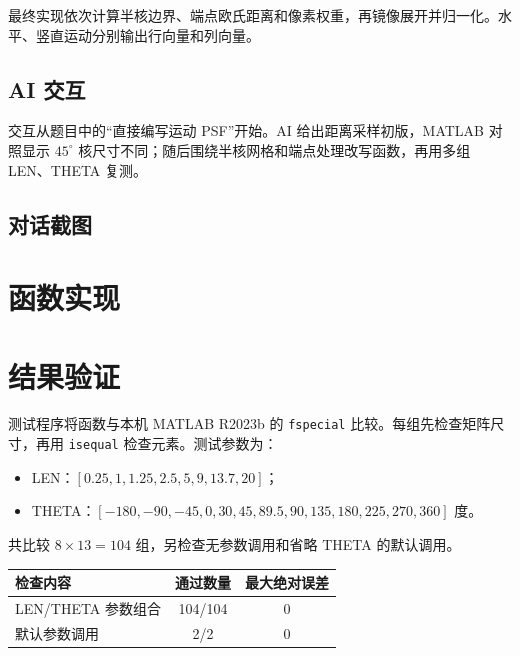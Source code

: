 \documentclass[UTF8,12pt,a4paper]{ctexart}
\begin{document}
最终实现依次计算半核边界、端点欧氏距离和像素权重，再镜像展开并归一化。水平、竖直运动分别输出行向量和列向量。

\subsection*{AI 交互}
交互从题目中的“直接编写运动 PSF”开始。AI 给出距离采样初版，MATLAB 对照显示 $45^\circ$ 核尺寸不同；随后围绕半核网格和端点处理改写函数，再用多组 LEN、THETA 复测。

\subsection*{对话截图}
\begin{center}
\vspace{3mm}

\vspace{3mm}

\end{center}

\clearpage
\section{函数实现}


\clearpage
\section{结果验证}
测试程序将函数与本机 MATLAB R2023b 的 \texttt{fspecial} 比较。每组先检查矩阵尺寸，再用 \texttt{isequal} 检查元素。测试参数为：
\begin{itemize}
  \item LEN：$[0.25,1,1.25,2.5,5,9,13.7,20]$；
  \item THETA：$[-180,-90,-45,0,30,45,89.5,90,135,180,225,270,360]$ 度。
\end{itemize}
共比较 $8\times13=104$ 组，另检查无参数调用和省略 THETA 的默认调用。

\begin{center}
\begin{tabular}{lcc}
\toprule
检查内容 & 通过数量 & 最大绝对误差 \\
\midrule
LEN/THETA 参数组合 & 104/104 & 0 \\
默认参数调用 & 2/2 & 0 \\
\bottomrule
\end{tabular}
\end{center}
\end{document}
